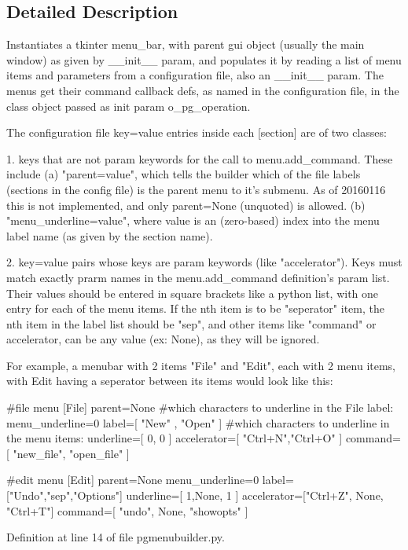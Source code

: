 \subsection{Detailed Description}
\begin{DoxyVerb}Instantiates a tkinter menu_bar, with parent gui object (usually the main window) 
as given by __init__ param, and populates it by reading a list of menu items and 
parameters from a configuration file, also an __init__ param. The menus get their 
command callback defs, as named in the configuration file, in the class object 
passed as init param o_pg_operation.

The configuration file key=value entries inside each [section] are of two classes:

1. keys that are not param keywords for the call to menu.add_command.  These include 
    (a) "parent=value", which tells the
    builder which of the file labels (sections in the config file) is the parent menu
    to it's submenu.  As of 20160116 this is not implemented, and only parent=None (unquoted) 
    is allowed.
    (b) "menu_underline=value", where value is an (zero-based) index into the menu label name 
    (as given by the section name).

2. key=value pairs whose keys are param keywords (like "accelerator").  Keys must match exactly
    prarm names in the menu.add_command definition's param list.  Their values should be 
    entered in square brackets like a python list, with one entry for each of the menu items.  
    If the nth item is to be "seperator" item, the nth item in the label list should be 
    "sep", and other items like "command" or accelerator, can be any value (ex: None), 
    as they will be ignored.

For example, a menubar with 2 items "File" and "Edit", each with 2 menu items, with
Edit having a seperator between its items would look like this: 

#file menu
[File]
parent=None
#which characters to underline in the File label:
menu_underline=0
label=[ "New" , "Open" ]
#which characters to underline in the menu items:
underline=[ 0, 0 ]
accelerator=[ "Ctrl+N","Ctrl+O" ]
command=[ "new_file", "open_file" ]

#edit menu
[Edit]
parent=None
menu_underline=0
label=["Undo","sep","Options"]
underline=[ 1,None, 1 ]
accelerator=["Ctrl+Z", None, "Ctrl+T"]
command=[ "undo", None, "showopts" ]  
\end{DoxyVerb}
 

Definition at line 14 of file pgmenubuilder.\+py.



